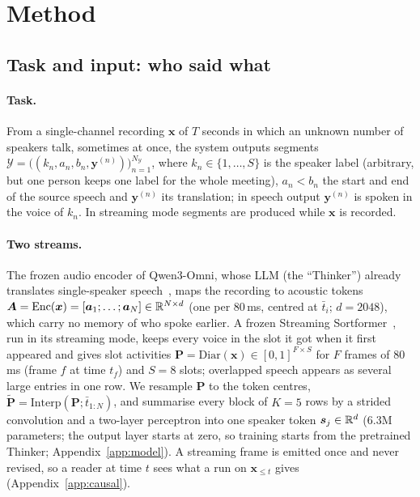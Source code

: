\section{Method}
\label{sec:method}



\subsection{Task and input: who said what}
\label{sec:method-task}
\label{sec:method-audio}
\label{sec:method-spk}
\label{sec:method-fuse}

\paragraph{Task.} From a single-channel recording $\bm{x}$ of $T$ seconds in which an unknown number of speakers talk,
sometimes at once, the system outputs segments
$\mathcal{Y}=\big((k_n,a_n,b_n,\bm{y}^{(n)})\big)_{n=1}^{N_\mathcal{Y}}$, where $k_n\in\{1,\dots,S\}$ is the speaker label (arbitrary, but one person keeps one label for the whole meeting),
$a_n<b_n$ the start and end of the source speech and $\bm{y}^{(n)}$ its translation; in speech output $\bm{y}^{(n)}$ is
spoken in the voice of $k_n$. In streaming mode segments are produced while $\bm{x}$ is recorded.

\paragraph{Two streams.} The frozen audio encoder of Qwen3-Omni, whose LLM (the ``Thinker'') already translates
single-speaker speech~\citep{xu2025qwen3omni}, maps the recording to acoustic tokens
$\bm{A}=\mathrm{Enc}(\bm{x})=[\bm{a}_1;\dots;\bm{a}_N]\in\mathbb{R}^{N\times d}$ (one per 80\,ms, centred at $\bar{t}_i$; $d=2048$), which carry no memory of who spoke earlier. A frozen Streaming Sortformer~\citep{medennikov2025streaming}, run in its
streaming mode, keeps every voice in the slot it got when it first appeared and gives slot activities
$\bm{P}=\mathrm{Diar}(\bm{x})\in[0,1]^{F\times S}$  for $F$ frames
of 80\,ms (frame $f$ at time $t_f$) and $S=8$ slots; overlapped speech appears as several large entries in one row. We resample $\bm{P}$
to the token centres, $\tilde{\bm{P}}=\mathrm{Interp}(\bm{P};\bar{t}_{1:N})$, and summarise every block of $K=5$ rows by a strided
convolution and a two-layer perceptron into one speaker token $\bm{s}_j\in\mathbb{R}^{d}$ (6.3M parameters; the output layer starts at zero, so training
starts from the pretrained Thinker; Appendix~\ref{app:model}). A streaming frame is emitted once and never revised, so a
reader at time $t$ sees what a run on $\bm{x}_{\le t}$ gives (Appendix~\ref{app:causal}).

